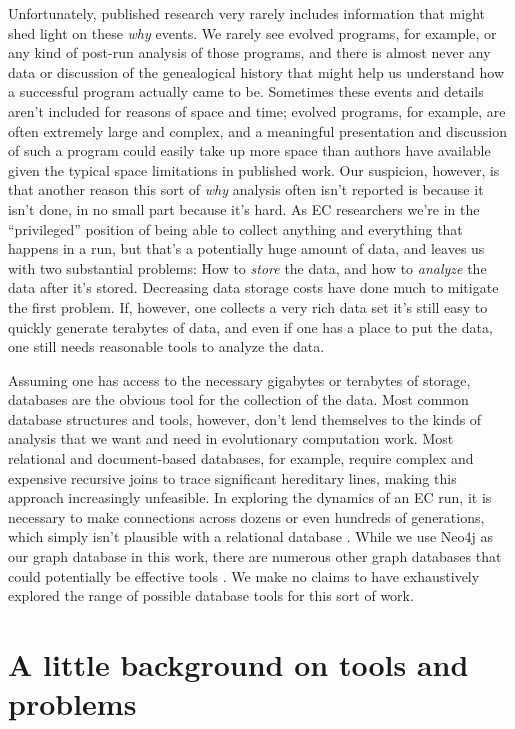 Unfortunately, published research very rarely includes information that might shed light on 
these \emph{why} events. We rarely see evolved programs, for example, or any kind of post-run analysis
of those programs, and there is almost never any data or discussion of the genealogical history that
might help us understand how a successful program actually came to be. 
Sometimes these events and details aren't included
for reasons of space and time; evolved programs, for example, are often extremely large and complex,
and a meaningful presentation and discussion of such a program could easily take up more space than
authors have available given the typical space limitations in published work.
Our suspicion, however, is that another reason this sort of \emph{why} analysis often isn't 
reported is because it isn't done, in no small part because it's hard. As EC researchers we're in the
``privileged'' position of being able to collect anything and everything that happens in a run, 
but that's a potentially huge amount of data, and leaves us with two substantial problems: 
How to \emph{store} the data, and how to \emph{analyze} the data
after it's stored. 
Decreasing data storage costs have done much to mitigate the first problem.
If, however, one collects a very rich data set it's still easy to quickly generate terabytes of data,
and even if one has a place to put the data, one still needs reasonable tools to analyze the data.

Assuming one has access to the necessary gigabytes or terabytes of storage, 
databases are the obvious tool for the collection of the data. Most common database structures and tools,
however,
don't lend themselves to the kinds of analysis that we want and need in evolutionary computation work. 
Most relational and document-based databases, for example, require complex and expensive 
recursive joins to trace significant hereditary lines, making this approach increasingly unfeasible.
In exploring the dynamics of an EC run, it is necessary to
make connections across dozens or even hundreds of generations, which simply isn't plausible with a
relational database \citep{Robinson:GraphDB:Book}. 
While we use Neo4j as our graph database in this work, there are 
numerous other 
graph databases that could potentially be effective tools \citep{wiki:GraphDB}. We make no claims
to have exhaustively explored the range of possible database tools for this sort of work.

\section{A little background on tools and problems}
\label{sec:background}

